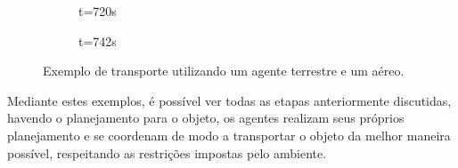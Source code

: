 \begin{figure}[ht!]
  \begin{subfigure}[t]{0.45\textwidth}
    \centering
    \caption{t=720s}
    \label{fig:sim_aerial_720}
  \end{subfigure}
  \hspace{0.2cm}
  \begin{subfigure}[t]{0.45\textwidth}
    \centering
    \caption{t=742s}
    \label{fig:sim_aerial_742}
  \end{subfigure}

  \caption{Exemplo de transporte utilizando um agente terrestre e um aéreo.}
  \label{fig:sim_aerial}

\end{figure}

Mediante estes exemplos, é possível ver todas as etapas anteriormente discutidas, havendo o planejamento para o objeto, os agentes realizam seus próprios planejamento e se coordenam de modo a transportar o objeto da melhor maneira possível, respeitando as restrições impostas pelo ambiente.



